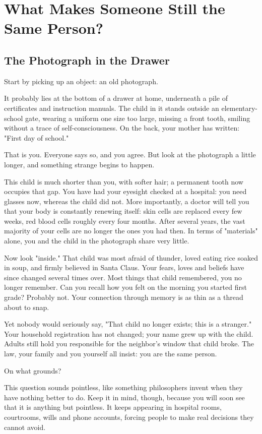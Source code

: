\chapter[What Makes You the Same Person?]{What Makes Someone Still the Same Person?}
\section{The Photograph in the Drawer}
Start by picking up an object: an old photograph.

It probably lies at the bottom of a drawer at home, underneath a pile of certificates and instruction manuals. The child in it stands outside an elementary-school gate, wearing a uniform one size too large, missing a front tooth, smiling without a trace of self-consciousness. On the back, your mother has written: "First day of school."

That is you. Everyone says so, and you agree. But look at the photograph a little longer, and something strange begins to happen.

This child is much shorter than you, with softer hair; a permanent tooth now occupies that gap. You have had your eyesight checked at a hospital: you need glasses now, whereas the child did not. More importantly, a doctor will tell you that your body is constantly renewing itself: skin cells are replaced every few weeks, red blood cells roughly every four months. After several years, the vast majority of your cells are no longer the ones you had then. In terms of "materials" alone, you and the child in the photograph share very little.

Now look "inside." That child was most afraid of thunder, loved eating rice soaked in soup, and firmly believed in Santa Claus. Your fears, loves and beliefs have since changed several times over. Most things that child remembered, you no longer remember. Can you recall how you felt on the morning you started first grade? Probably not. Your connection through memory is as thin as a thread about to snap.

Yet nobody would seriously say, "That child no longer exists; this is a stranger." Your household registration has not changed; your name grew up with the child. Adults still hold you responsible for the neighbor's window that child broke. The law, your family and you yourself all insist: you are the same person.

On what grounds?

This question sounds pointless, like something philosophers invent when they have nothing better to do. Keep it in mind, though, because you will soon see that it is anything but pointless. It keeps appearing in hospital rooms, courtrooms, wills and phone accounts, forcing people to make real decisions they cannot avoid.

